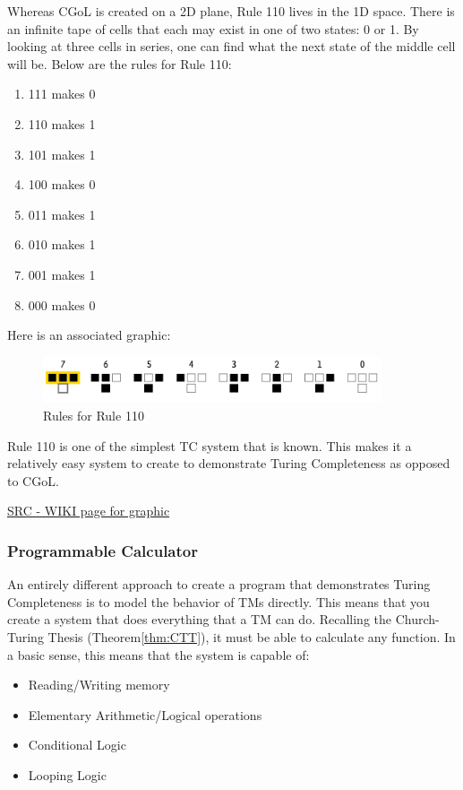 Whereas CGoL is created on a 2D plane, Rule 110 lives in the 1D space.
There is an infinite tape of cells that each may exist in one of two states: 0 or 1.
By looking at three cells in series, one can find what the next state of the middle cell will be.
Below are the rules for Rule 110:

\begin{enumerate}
    \item 111 makes 0
    \item 110 makes 1
    \item 101 makes 1
    \item 100 makes 0
    \item 011 makes 1
    \item 010 makes 1
    \item 001 makes 1
    \item 000 makes 0
\end{enumerate}

Here is an associated graphic:

\begin{figure}[htb]
    \centering
    \includegraphics[width=10cm]{images/rule110.png}
       \caption{Rules for Rule 110}
           \label{fig:Rule110}
\end{figure}

Rule 110 is one of the simplest TC system that is known.
This makes it a relatively easy system to create to demonstrate Turing Completeness as opposed to CGoL.

\href{https://commons.wikimedia.org/wiki/File:One-d-cellular-automaton-rule-110.gif}{SRC - WIKI page for graphic}

\subsubsection{Programmable Calculator}\label{subsubsec:ProgCalc}

An entirely different approach to create a program that demonstrates Turing Completeness is to model the behavior of TMs directly.
This means that you create a system that does everything that a TM can do.
Recalling the Church-Turing Thesis (Theorem\ref{thm:CTT}), it must be able to calculate any function.
In a basic sense, this means that the system is capable of:

\begin{itemize}
    \item Reading/Writing memory
    \item Elementary Arithmetic/Logical operations
    \item Conditional Logic
    \item Looping Logic
\end{itemize}

